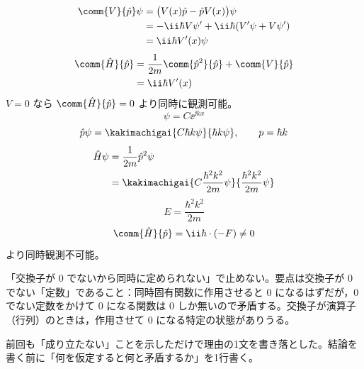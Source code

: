 \begin{align*}
\comm{V}{\hat{p}}\psi&=\bigl(V(x)\hat{p}-\hat{p}V(x)\bigr)\psi\\
&=-\ii\hbar V\psi'+\ii\hbar(V'\psi+V\psi')\\
&=\ii\hbar V'(x)\psi
\end{align*}
\begin{align*}
\comm{\hat{H}}{\hat{p}}&=\frac{1}{2m}\comm{\hat{p}^{2}}{\hat{p}}+\comm{V}{\hat{p}}\\
&=\ii\hbar V'(x)
\end{align*}
$V=0$ なら $\comm{\hat{H}}{\hat{p}}=0$ より同時に観測可能。
\[ \psi=C\ee^{\ii kx} \]
\[ \hat{p}\psi=\kakimachigai{C\hbar k\psi}{\hbar k\psi},\qquad p=\hbar k \]
\begin{align*}
\hat{H}\psi&=\frac{1}{2m}\hat{p}^{2}\psi\\
&=\kakimachigai{C\frac{\hbar^{2}k^{2}}{2m}\psi}{\frac{\hbar^{2}k^{2}}{2m}\psi}
\end{align*}
\[ E=\frac{\hbar^{2}k^{2}}{2m} \]
\[ \comm{\hat{H}}{\hat{p}}=\ii\hbar\cdot(-F)\neq0 \]
より同時観測不可能。
\item 「交換子が $0$ でないから同時に定められない」で止めない。要点は交換子が $0$ でない「定数」であること：同時固有関数に作用させると $0$ になるはずだが，$0$ でない定数をかけて $0$ になる関数は $0$ しか無いので矛盾する。交換子が演算子（行列）のときは，作用させて $0$ になる特定の状態がありうる。
\item {} 前回も「成り立たない」ことを示しただけで理由の1文を書き落とした。結論を書く前に「何を仮定すると何と矛盾するか」を1行書く。
